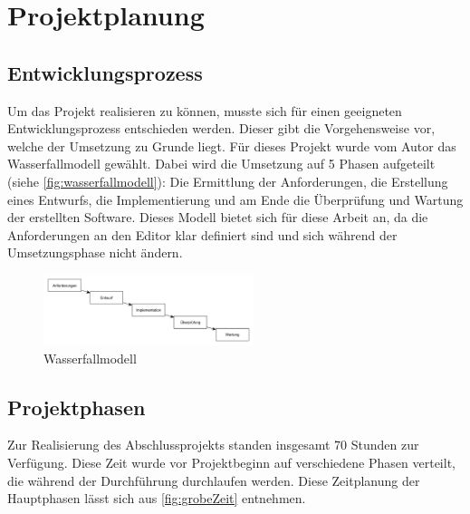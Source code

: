 \section{Projektplanung}

\subsection{Entwicklungsprozess}

Um das Projekt realisieren zu können, musste sich für einen geeigneten Entwicklungsprozess entschieden werden. Dieser gibt die Vorgehensweise vor, welche der Umsetzung zu Grunde liegt. Für dieses Projekt wurde vom Autor das Wasserfallmodell gewählt. Dabei wird die Umsetzung auf 5 Phasen aufgeteilt (siehe \autoref{fig:wasserfallmodell}): Die Ermittlung der Anforderungen, die Erstellung eines Entwurfs, die Implementierung und am Ende die Überprüfung und Wartung der erstellten Software. Dieses Modell bietet sich für diese Arbeit an, da die Anforderungen an den Editor klar definiert sind und sich während der Umsetzungsphase nicht ändern.

\begin{figure}[H]
	\centering
	\includegraphics[height=78px]{../graphic/diagrams/SD_Wasserfallmodell/Wasserfallmodell}
	\caption{Wasserfallmodell}
	\label{fig:wasserfallmodell}
\end{figure}

\subsection{Projektphasen}

Zur Realisierung des Abschlussprojekts standen insgesamt 70 Stunden zur Verfügung. Diese Zeit wurde vor Projektbeginn auf verschiedene Phasen verteilt, die während der Durchführung durchlaufen werden. Diese Zeitplanung der Hauptphasen lässt sich aus \autoref{fig:grobeZeit} entnehmen.

